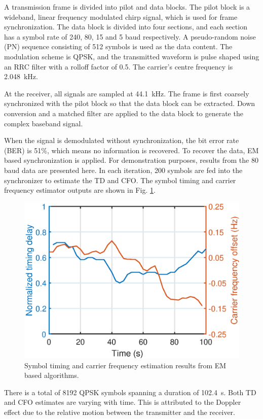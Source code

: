 \documentclass[journal,comsoc,onecolumn, 12pt,draftclsnofoot]{IEEEtran}
\begin{document}
A transmission frame is divided into pilot and data blocks. The pilot block is a wideband, linear frequency modulated chirp signal, which is used for frame synchronization.
The data block is divided into four sections, and each section has a symbol rate of 240, 80, 15 and 5 baud respectively. 
A pseudo-random noise (PN) sequence consisting of 512 symbols is used as the data content.
The modulation scheme is QPSK, and the transmitted waveform is pulse shaped using an RRC filter with a rolloff factor of 0.5. 
The carrier's centre frequency is 2.048~kHz. 

At the receiver, all signals are sampled at 44.1~kHz. The frame is first coarsely synchronized with the pilot block so that the data block can be extracted.
Down conversion and a matched filter are applied to the data block to generate the complex baseband signal.

When the signal is demodulated without synchronization, the bit error rate (BER) is 51\%, which means no information is recovered.
To recover the data, EM based synchronization is applied.
For demonstration purposes, results from the 80 baud data are presented here.
In each iteration, 200 symbols are fed into the synchronizer to estimate the TD and CFO. 
The symbol timing and carrier frequency estimator outputs are shown in Fig. \ref{fig:per_exp}.

\begin{figure}[ht]
\centering
\includegraphics[width=3 in]{pic/per_exp.eps}
\caption{Symbol timing and carrier frequency estimation results from EM based algorithms.}
\label{fig:per_exp} 
\end{figure} 

There is a total of 8192 QPSK symbols spanning a duration of 102.4~s.
Both TD and CFO estimates are varying with time.
This is attributed to the Doppler effect due to the relative motion between the transmitter and the receiver.
\end{document}
